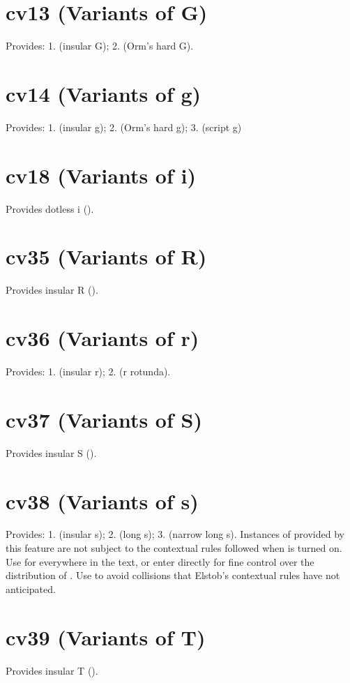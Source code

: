 \documentclass[12pt,letterpaper,openany]{book}
\begin{document}
\section{cv13 (Variants of G)}
Provides: 1.  (insular G); 2.  (Orm’s hard G).

\section{cv14 (Variants of g)}
Provides: 1.  (insular g); 2.  (Orm’s hard g);
3.  (script g)

\section{cv18 (Variants of i)}
Provides dotless i ().

\section{cv35 (Variants of R)}
Provides insular R ().

\section{cv36 (Variants of r)}
Provides: 1.  (insular r); 2.  (r rotunda).

\section{cv37 (Variants of S)}
Provides insular S ().

\section{cv38 (Variants of s)}
Provides: 1.  (insular s); 2.  (long s);
3.  (narrow long s). Instances of \textbf{}
provided by this feature are not subject to the contextual rules followed
when  is turned on. Use  for \textbf{}
everywhere in the text, or enter  directly for fine control over the
distribution of \textbf{}. Use  to avoid collisions that
Elstob’s contextual rules have not anticipated.

\section{cv39 (Variants of T)}
Provides insular T ().
\end{document}
